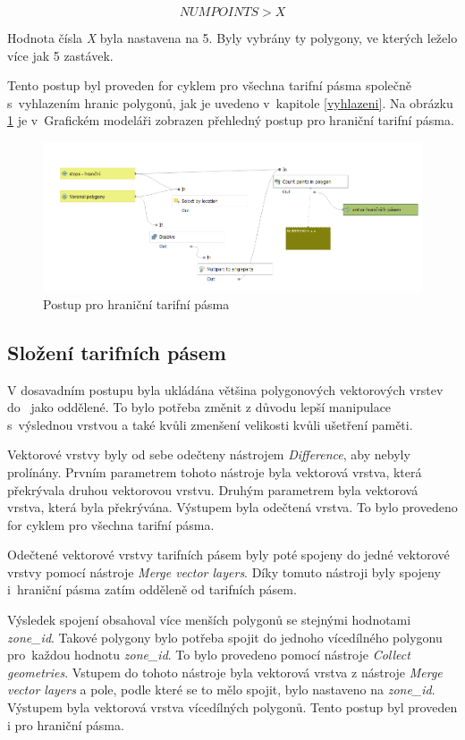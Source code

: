 \[NUMPOINTS > X\]

Hodnota čísla \textit{X} byla nastavena na 5. Byly vybrány ty polygony, ve kterých leželo více jak 5 zastávek.

Tento postup byl proveden for cyklem pro všechna tarifní pásma společně s~vy\-hlazením hranic polygonů,
jak je uvedeno v~kapitole \ref{vyhlazeni}. Na obrázku \ref{fig:postup-border-zones} je v~Grafickém modeláři zobrazen
přehledný postup pro hraniční tarifní pásma. 

\begin{figure}[H] \centering
    \includegraphics[width=400pt]{./pictures/postup-border-zones.png}
    \caption[Postup pro hraniční tarifní pásma]{Postup pro hraniční tarifní pásma}
	\label{fig:postup-border-zones}              
\end{figure}

\subsection{Složení tarifních pásem}
\label{seskupeni}

V dosavadním postupu byla ukládána většina polygonových vektorových vrstev do~ jako oddělené.
To bylo potřeba změnit z důvodu lepší manipulace s~výslednou vrstvou a také kvůli zmenšení velikosti 
kvůli ušetření paměti.

Vektorové vrstvy byly od sebe odečteny nástrojem \textit{Difference}, aby nebyly prolínány. 
Prvním parametrem tohoto nástroje byla vektorová vrstva, která překrývala druhou vektorovou vrstvu. 
Druhým parametrem byla vektorová vrstva, která byla překrývána. Výstupem byla odečtená vrstva.
To bylo provedeno for cyklem pro všechna tarifní pásma.

Odečtené vektorové vrstvy tarifních pásem byly poté spojeny do jedné vektorové vrstvy pomocí 
nástroje \textit{Merge vector layers}. Díky tomuto nástroji byly spojeny i~hraniční pásma zatím odděleně od tarifních pásem.

Výsledek spojení obsahoval více menších polygonů se stejnými hodnotami \textit{zone\-\_id}.
Takové polygony bylo potřeba spojit do jednoho vícedílného polygonu pro~každou hodnotu \textit{zone\_id}.
To bylo provedeno pomocí nástroje \textit{Collect geometries}. Vstupem do tohoto nástroje byla vektorová vrstva z 
nástroje \textit{Merge vector layers} a pole, podle které se to mělo spojit, bylo nastaveno na \textit{zone\_id}.
Výstupem byla vektorová vrstva vícedílných polygonů. Tento postup byl proveden i pro hraniční pásma.

